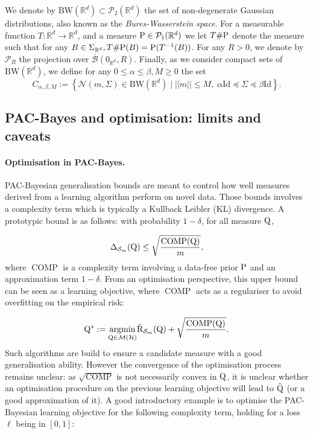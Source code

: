 We denote by $\text{BW}(\mathbb{R}^d)\subset \mathcal{P}_2(\mathbb{R}^d)$ the set of non-degenerate Gaussian distributions, also known as the \emph{Bures-Wasserstein space}. For a measurable function $T:\mathbb{R}^d \rightarrow \mathbb{R}^d$, and a measure $\P\in\mathcal{P}_1(\mathbb{R}^d)$ we let $T\#\P$ denote the measure such that for any $B\in \Sigma_{\mathbb{R}^d}, T\#\P(B)= \P(T^{-1}(B))$.
For any $R>0$, we denote by $\mathcal{P}_{R}$ the projection over $\bar{\mathcal{B}}(0_{\mathbb{R}^d},R)$.
Finally, as we consider compact sets of $\text{BW}(\mathbb{R}^d)$, we define for any $0\leq \alpha\leq \beta, M\geq 0$ the set
\[ C_{\alpha,\beta,M} := \left\{ \mathcal{N}(m,\Sigma) \in \text{BW}(\mathbb{R}^d) \mid ||m||\leq M,\; \alpha \mathrm{Id} \preceq \Sigma \preceq \beta \mathrm{Id} \right\}.  \]

\subsection{PAC-Bayes and optimisation: limits and caveats}
\label{sec: intro_optim}
\paragraph{Optimisation in PAC-Bayes.}
PAC-Bayesian generalisation bounds are meant to control how well measures derived from a learning algorithm perform on novel data.  Those bounds involves a complexity term which is typically a Kullback Leibler (KL) divergence. A prototypic bound is as follows: with probability $1-\delta$, for all measure $\Q$,

$$\Delta_{\Sm}(\Q) \leq \sqrt{\frac{\operatorname{COMP}(\Q)}{m}}, $$
where $\operatorname{COMP}$ is a complexity term involving a data-free prior $\P$ and an approximation term $1-\delta$.
From an optimisation perspective, this upper bound can be seen as a learning objective, where $\operatorname{COMP}$ acts as a regulariser to avoid overfitting on the empirical risk:

$$ \Q^* := \underset{\Q\in\mathcal{M}(\mathcal{H})}{\operatorname{argmin}} \Riskhat_{\Sm}(\Q) + \sqrt{\frac{\operatorname{COMP}(\Q)}{m}}.$$
Such algorithms are build to ensure a candidate measure with a good generalisation ability.
However the convergence of the optimisation process remains unclear: as $\sqrt{\operatorname{COMP}}$ is not necessarily convex in $\Q$, it is unclear whether an optimisation procedure on the previous learning objective will lead to $\hat{\Q}$ (or a good approximation of it). A good introductory example is to optimise the PAC-Bayesian learning objective for the following complexity term, holding for a loss $\ell$ being in $[0,1]$:

